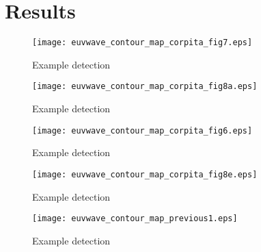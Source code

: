 \section{Results}\label{sec:results}

\begin{figure}
\begin{center}
\texttt{[image: euvwave\_contour\_map\_corpita\_fig7.eps]}
\caption{Example detection}
\label{corpita_fig7}
\end{center}
\end{figure}

\begin{figure}
\begin{center}
\texttt{[image: euvwave\_contour\_map\_corpita\_fig8a.eps]}
\caption{Example detection}
\label{corpita_fig8a}
\end{center}
\end{figure}

\begin{figure}
\begin{center}
\texttt{[image: euvwave\_contour\_map\_corpita\_fig6.eps]}
\caption{Example detection}
\label{corpita_fig6}
\end{center}
\end{figure}

\begin{figure}
\begin{center}
\texttt{[image: euvwave\_contour\_map\_corpita\_fig8e.eps]}
\caption{Example detection}
\label{corpita_fig8e}
\end{center}
\end{figure}

\begin{figure}
\begin{center}
\texttt{[image: euvwave\_contour\_map\_previous1.eps]}
\caption{Example detection}
\label{previous1}
\end{center}
\end{figure}
